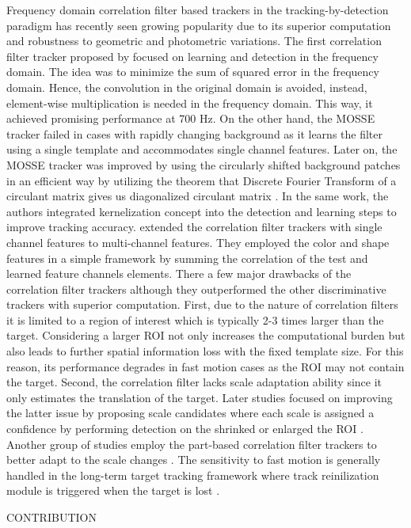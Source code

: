 \documentclass[10pt,twocolumn,letterpaper]{article}
\begin{document}
Frequency domain correlation filter based trackers in the tracking-by-detection paradigm has recently seen growing popularity due to its superior computation and robustness to geometric and photometric variations. The first correlation filter tracker proposed by \cite{bolme2010visual} focused on learning and detection in the frequency domain. The idea was to minimize the sum of squared error in the frequency domain. Hence, the convolution in the original domain is avoided, instead, element-wise multiplication is needed in the frequency domain. This way, it achieved promising performance at 700 Hz. On the other hand, the MOSSE tracker failed in cases with rapidly changing background as it learns the filter using a single template and accommodates single channel features. Later on, the MOSSE tracker was improved by using the circularly shifted background patches in an efficient way by utilizing the theorem that Discrete Fourier Transform of a circulant matrix gives us diagonalized circulant matrix \cite{henriques2012exploiting,henriques2015high}. In the same work, the authors integrated kernelization concept into the detection and learning steps to improve tracking accuracy. \cite{galoogahi2013multi,henriques2015high} extended the correlation filter trackers with single channel features to multi-channel features. They employed the color and shape features in a simple framework by summing the correlation of the test and learned feature channels elements. There a few major drawbacks of the correlation filter trackers although they outperformed the other discriminative trackers with superior computation. First, due to the nature of correlation filters it is limited to a region of interest which is typically 2-3 times larger than the target. Considering a larger ROI not only increases the computational burden but also leads to further spatial information loss with the fixed template size. For this reason, its performance degrades in fast motion cases as the ROI may not contain the target. Second, the correlation filter lacks scale adaptation ability since it only estimates the translation of the target. Later studies focused on improving the latter issue by proposing scale candidates where each scale is assigned a confidence by performing detection on the shrinked or enlarged the ROI \cite{li2014scale,tang2015multi,bibi2015multi,ma2015long}. Another group of studies employ the part-based correlation filter trackers to better adapt to the scale changes \cite{liu2015real,akin2016deformable}. The sensitivity to fast motion is generally handled in the long-term target tracking framework where track reinilization module is triggered when the target is lost \cite{ma2015long,de2015board,li2016monocular}. 

CONTRIBUTION



{\small


}
\end{document}
